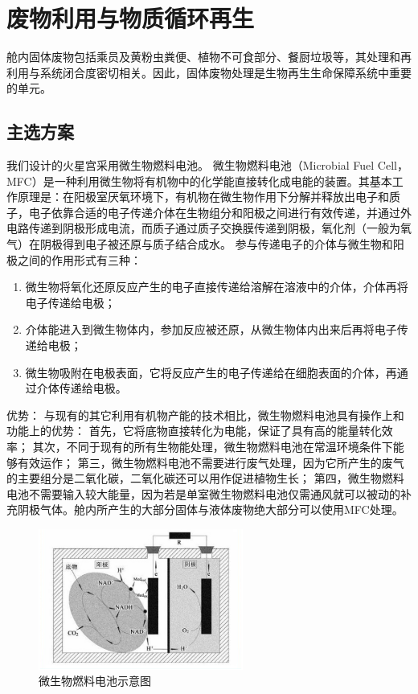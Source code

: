 \chapter{废物利用与物质循环再生}
\label{chp:recycling:begin}

舱内固体废物包括乘员及黄粉虫粪便、植物不可食部分、餐厨垃圾等，其处理和再利用与系统闭合度密切相关。因此，固体废物处理是生物再生生命保障系统中重要的单元。

\section{主选方案}

我们设计的火星宫采用微生物燃料电池。
微生物燃料电池（Microbial Fuel Cell，MFC）是一种利用微生物将有机物中的化学能直接转化成电能的装置。其基本工作原理是：在阳极室厌氧环境下，有机物在微生物作用下分解并释放出电子和质子，电子依靠合适的电子传递介体在生物组分和阳极之间进行有效传递，并通过外电路传递到阴极形成电流，而质子通过质子交换膜传递到阴极，氧化剂（一般为氧气）在阴极得到电子被还原与质子结合成水。
参与传递电子的介体与微生物和阳极之间的作用形式有三种：
\begin{enumerate}
  \item
    微生物将氧化还原反应产生的电子直接传递给溶解在溶液中的介体，介体再将电子传递给电极；
  \item
    介体能进入到微生物体内，参加反应被还原，从微生物体内出来后再将电子传递给电极；
  \item
微生物吸附在电极表面，它将反应产生的电子传递给在细胞表面的介体，再通过介体传递给电极。
\end{enumerate}

优势：
与现有的其它利用有机物产能的技术相比，微生物燃料电池具有操作上和功能上的优势： 首先，它将底物直接转化为电能，保证了具有高的能量转化效率； 其次，不同于现有的所有生物能处理，微生物燃料电池在常温环境条件下能够有效运作； 第三，微生物燃料电池不需要进行废气处理，因为它所产生的废气的主要组分是二氧化碳，二氧化碳还可以用作促进植物生长； 第四，微生物燃料电池不需要输入较大能量，因为若是单室微生物燃料电池仅需通风就可以被动的补充阴极气体。舱内所产生的大部分固体与液体废物绝大部分可以使用MFC处理。

\begin{figure}[H]
  \centering
  \includegraphics[width=0.6\textwidth]{figure/battery.png}
  \caption{微生物燃料电池示意图}
\end{figure}

